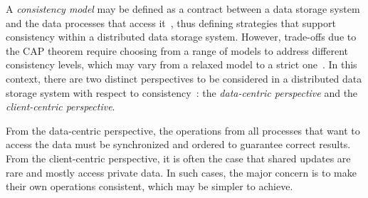 

A {\it consistency model} may be defined as a contract between a data storage system and the data processes that access it~\cite{tanenbaum:2007}, 
thus defining strategies that support consistency within a distributed data storage system. However, trade-offs due to the CAP theorem require choosing from a range of models to address different consistency levels, which may vary from a relaxed model to a strict one~\cite{bermbach2013consistency}. 
In this context, there are two distinct perspectives to be considered in a distributed data storage system with respect to consistency~\cite{tanenbaum:2007}: 
the \textit{data-centric perspective} and the \textit{client-centric perspective}.

From the data-centric perspective, the operations from all processes that want to access the data must be synchronized and ordered to guarantee correct results. From the client-centric perspective, it is often the case that shared updates are rare and mostly access private data. In such cases, the major concern is to make their own operations consistent, which may be simpler to achieve.

